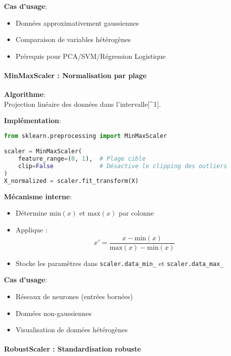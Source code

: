\documentclass{article}
\begin{document}
\textbf{Cas d'usage}: \\
\begin{itemize}
    \item Données approximativement gaussiennes
    \item Comparaison de variables hétérogènes
    \item Prérequis pour PCA/SVM/Régression Logistique
\end{itemize}

\paragraph*{MinMaxScaler : Normalisation par plage}

\textbf{Algorithme}: \\
Projection linéaire des données dans l'intervalle[^1].

\textbf{Implémentation}: \\
\begin{lstlisting}[language=Python]
from sklearn.preprocessing import MinMaxScaler

scaler = MinMaxScaler(
    feature_range=(0, 1),  # Plage cible
    clip=False             # Désactive le clipping des outliers
)
X_normalized = scaler.fit_transform(X)
\end{lstlisting}

\textbf{Mécanisme interne}: \\
\begin{itemize}
    \item Détermine $\text{min}(x)$ et $\text{max}(x)$ par colonne
    \item Applique :
    \[
    x' = \frac{x - \text{min}(x)}{\text{max}(x) - \text{min}(x)}
    \]
    \item Stocke les paramètres dans \texttt{scaler.data\_min\_} et \texttt{scaler.data\_max\_}
\end{itemize}

\textbf{Cas d'usage}: \\
\begin{itemize}
    \item Réseaux de neurones (entrées bornées)
    \item Données non-gaussiennes
    \item Visualisation de données hétérogènes
\end{itemize}

\paragraph*{RobustScaler : Standardisation robuste}
\end{document}
